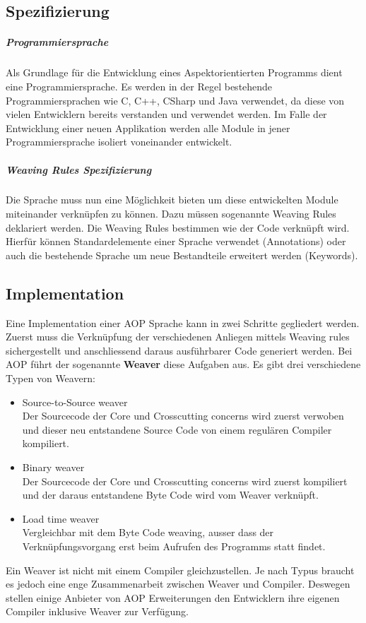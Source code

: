 \subsection{Spezifizierung}
\subparagraph{Programmiersprache}
Als Grundlage für die Entwicklung eines Aspektorientierten Programms dient eine Programmiersprache. Es werden in der Regel bestehende Programmiersprachen wie C, C++, CSharp und Java verwendet, da diese von vielen Entwicklern bereits verstanden und verwendet werden. Im Falle der Entwicklung einer neuen Applikation werden alle Module in jener Programmiersprache isoliert voneinander entwickelt.
\subparagraph{Weaving Rules Spezifizierung}
Die Sprache muss nun eine Möglichkeit bieten um diese entwickelten Module miteinander verknüpfen zu können. Dazu müssen sogenannte Weaving Rules deklariert werden. Die Weaving Rules bestimmen wie der Code verknüpft wird. Hierfür können Standardelemente einer Sprache verwendet (Annotations) oder auch die bestehende Sprache um neue Bestandteile erweitert werden (Keywords).
\subsection{Implementation}
Eine Implementation einer AOP Sprache kann in zwei Schritte gegliedert werden. Zuerst muss die Verknüpfung der verschiedenen Anliegen mittels Weaving rules sichergestellt und anschliessend daraus  ausführbarer Code generiert werden. Bei AOP führt der sogenannte \textbf{Weaver} diese Aufgaben aus. Es gibt drei verschiedene Typen von Weavern:

\begin{itemize}
\item Source-to-Source weaver \\ Der Sourcecode der Core und Crosscutting concerns wird zuerst verwoben und dieser neu entstandene Source Code von einem regulären Compiler kompiliert. 
\item Binary weaver \\ Der Sourcecode der Core und Crosscutting concerns wird zuerst kompiliert und der daraus entstandene Byte Code wird vom Weaver verknüpft.
\item Load time weaver \\ Vergleichbar mit dem Byte Code weaving, ausser dass der Verknüpfungsvorgang erst beim Aufrufen des Programms statt findet.
\end{itemize}

Ein Weaver ist nicht mit einem Compiler gleichzustellen. Je nach Typus braucht es jedoch eine enge Zusammenarbeit zwischen Weaver und Compiler. Deswegen stellen einige Anbieter von AOP Erweiterungen den Entwicklern ihre eigenen Compiler inklusive Weaver zur Verfügung.

